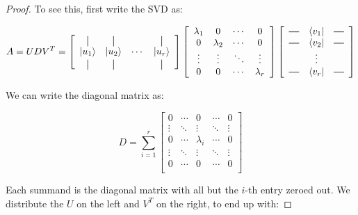 \documentclass{amsbook}
\newcommand*{\vertbar}{\rule[-1ex]{0.5pt}{2.5ex}}
\newcommand*{\horzbar}{\rule[.5ex]{2.5ex}{0.5pt}}
\begin{document}
\begin{proof}
To see this, first write the SVD as:

$$
A = UDV^T =
\left[
  \begin{array}{cccc}
    \vertbar & \vertbar & & \vertbar \\
    | u _1\rangle    & | u _2\rangle   & \cdots & | u _r\rangle    \\
    \vertbar & \vertbar & & \vertbar 
  \end{array}
\right]
\left[
\begin{array}{cccc}
\lambda_1 & 0 & \cdots & 0 \\
0 & \lambda_2 & \cdots & 0 \\
\vdots & \vdots & \ddots & \vdots \\
0 & 0 & \cdots & \lambda_r \\
\end{array}
\right]
\left[
  \begin{array}{ccc}
    \horzbar & \langle v _1| & \horzbar \\
    \horzbar & \langle v _2|& \horzbar \\
             & \vdots    &          \\
    \horzbar & \langle v _r|& \horzbar
  \end{array}
\right]
$$

\noindent
We can write the diagonal matrix as:

$$
D = \sum_{i=1}^r \left[\begin{array}{ccccc}
0 & \cdots & 0 & \cdots & 0 \\
\vdots & \ddots & \vdots & \ddots & \vdots \\
0 & \cdots & \lambda_i & \cdots & 0 \\
\vdots & \ddots & \vdots & \ddots & \vdots \\
0 & \cdots & 0 & \cdots & 0 \\
\end{array}\right]
$$

\noindent
Each summand is the diagonal matrix with all but the $i$-th entry zeroed out.  We distribute the $U$ on the left and $V^T$ on the right, to end up with:


\end{proof}
\end{document}
